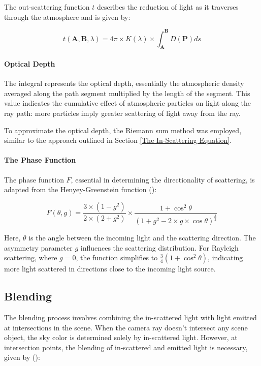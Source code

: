 The out-scattering function $t$ describes the reduction of light as it traverses through the atmosphere and is given by:

\begin{equation}
    t(\mathbf{A}, \mathbf{B}, \lambda) = 4\pi \times K(\lambda) \times \int_{\mathbf{A}}^{\mathbf{B}} D(\mathbf{P}) ds
\end{equation}

\paragraph{Optical Depth}
\label{Optical Depth}

The integral represents the optical depth, essentially the atmospheric density averaged along the path segment multiplied by the length of the segment. This value indicates the cumulative effect of atmospheric particles on light along the ray path: more particles imply greater scattering of light away from the ray.

To approximate the optical depth, the Riemann sum method was employed, similar to the approach outlined in Section \ref{The In-Scattering Equation}.

\paragraph{The Phase Function}

The phase function $F$, essential in determining the directionality of scattering, is adapted from the Henyey-Greenstein function ():

\begin{equation}
    F(\theta, g) = \frac{3 \times (1 - g^2)}{2 \times (2 + g^2)} \times \frac{1 + \cos^2 \theta}{(1 + g^2 - 2 \times g \times \cos \theta)^{\frac{3}{2}}}
\end{equation}

Here, $\theta$ is the angle between the incoming light and the scattering direction. The asymmetry parameter $g$ influences the scattering distribution. For Rayleigh scattering, where $g = 0$, the function simplifies to $\frac{3}{4}(1 + \cos^2\theta)$, indicating more light scattered in directions close to the incoming light source.

\subsection{Blending}

The blending process involves combining the in-scattered light with light emitted at intersections in the scene. When the camera ray doesn't intersect any scene object, the sky color is determined solely by in-scattered light. However, at intersection points, the blending of in-scattered and emitted light is necessary, given by ():

